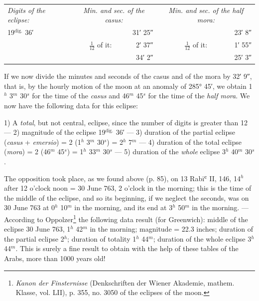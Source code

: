 \documentclass[11pt]{article}
\begin{document}
\begin{center}\small\begin{tabular}{lrrrr}
\emph{Digits of the eclipse:} & \multicolumn{2}{c}{\emph{Min. and sec. of the casus:}} & \multicolumn{2}{c}{\emph{Min. and sec. of the half mora:}} \\
19$^{\text{dig.}}$ 36′ &  & 31′ 25″ &  & 23′ 8″ \\
 & $\tfrac{1}{12}$ of it: & 2′ 37″ & $\tfrac{1}{12}$ of it: & 1′ 55″ \\
 &  & 34′ 2″\footnotemark{} &  & 25′ 3″ \\
\end{tabular}\end{center}
\addtocounter{footnote}{-1}
\par If we now divide the minutes and seconds of the casus and of the mora by 32′ 9″, that is, by the hourly motion of the moon at an anomaly of 285° 45′, we obtain 1$^{h}$ 3$^{m}$ 30$^{s}$ for the time of the \emph{casus} and 46$^{m}$ 45$^{s}$ for the time of the \emph{half mora}. We now have the following data for this eclipse:\par
\par 1) A \emph{total}, but not central, eclipse, since the number of digits is greater than 12 — 2) magnitude of the eclipse 19$^{\text{dig.}}$ 36′ — 3) duration of the partial eclipse (\emph{casus} + \emph{emersio}) = 2 (1$^{h}$ 3$^{m}$ 30$^{s}$) = 2$^{h}$ 7$^{m}$ — 4) duration of the total eclipse (\emph{mora}) = 2 (46$^{m}$ 45$^{s}$) = 1$^{h}$ 33$^{m}$ 30$^{s}$ — 5) duration of the \emph{whole} eclipse 3$^{h}$ 40$^{m}$ 30$^{s}$.\par
\par The opposition took place, as we found above (p. 85), on 13 Rabīʿ II, 146, 14$^{h}$ after 12 o'clock noon = 30 June 763, 2 o'clock in the morning; this is the time of the middle of the eclipse, and so its beginning, if we neglect the seconds, was on 30 June 763 at 0$^{h}$ 10$^{m}$ in the morning, and its end at 3$^{h}$ 50$^{m}$ in the morning. — According to Oppolzer\footnote{\emph{Kanon der Finsternisse} (Denkschriften der Wiener Akademie, mathem. Klasse, vol. LII), p. 355, no. 3050 of the eclipses of the moon.} the following data result (for Greenwich): middle of the eclipse 30 June 763, 1$^{h}$ 42$^{m}$ in the morning; magnitude = 22.3 inches; duration of the partial eclipse 2$^{h}$; duration of totality 1$^{h}$ 44$^{m}$; duration of the whole eclipse 3$^{h}$ 44$^{m}$. This is surely a fine result to obtain with the help of these tables of the Arabs, more than 1000 years old!\par
\end{document}
